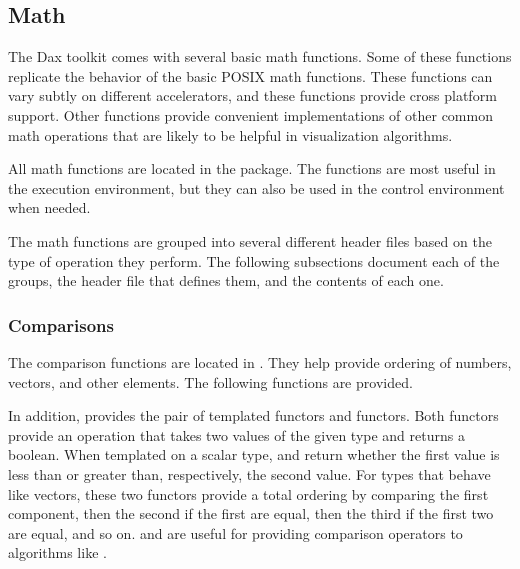 
\subsection{Math}
\label{sec:Math}


The Dax toolkit comes with several basic math functions. Some of these
functions replicate the behavior of the basic POSIX math functions. These
functions can vary subtly on different accelerators, and these functions
provide cross platform support. Other functions provide convenient
implementations of other common math operations that are likely to be
helpful in visualization algorithms.

All math functions are located in the \daxmath{} package. The functions are
most useful in the execution environment, but they can also be used in the
control environment when needed.

The math functions are grouped into several different header files based on
the type of operation they perform. The following subsections document each
of the groups, the header file that defines them, and the contents of each
one.


\subsubsection{Comparisons}

The comparison functions are located in
. They help provide ordering of numbers,
vectors, and other elements. The following functions are provided.


In addition,  provides the pair of templated
functors  and  functors. Both
functors provide an operation that takes two values of the given type and
returns a boolean. When templated on a scalar type,
 and  return whether
the first value is less than or greater than, respectively, the second
value. For types that behave like vectors, these two functors provide a
total ordering by comparing the first component, then the second if the
first are equal, then the third if the first two are equal, and so
on.  and  are useful
for providing comparison operators to algorithms like .

